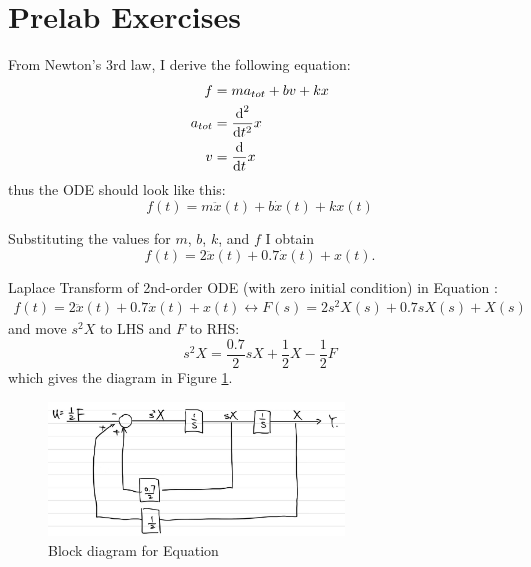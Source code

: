 

\def\LABNUMBER{1}
\def\LABTITLE{Analog Simulation}
\newcommand\K{\text{k}}



\makeMyTitle

\section{Prelab Exercises}

From Newton's 3rd law, I derive the following equation:
\begin{align*}
  f &= ma_{tot} + bv + kx \\
  a_{tot} &= \frac{\text{d}^2}{\text{d} t^2} x \\
  v &= \frac{\text{d}}{\text{d} t} x
\end{align*}
thus the ODE should look like this:
\begin{equation*}
  f(t)=m\ddot{x}(t)+b\dot{x}(t)+kx(t)
\end{equation*}

Substituting the values for $m$, $b$, $k$, and $f$ I obtain
\begin{equation}\label{eq-ode}
  f(t)=2\ddot{x}(t)+0.7\dot{x}(t)+x(t).
\end{equation}



Laplace Transform of 2nd-order ODE (with zero initial condition) in Equation
:
\begin{align*}
  f(t)=2\ddot{x}(t)+0.7\dot{x}(t)+x(t) \leftrightarrow F(s)=2 s^2 X(s)+
                                                            0.7 sX(s) + X(s)
\end{align*}
and move $s^2 X$ to LHS and $F$ to RHS:
\begin{equation} 
  s^2 X = \frac{0.7}{2}sX+\frac{1}{2}X-\frac{1}{2}F
  \label{eq-diagram}
\end{equation}
which gives the diagram in Figure \ref{pic-diagram}.
\begin{figure}[h!]
  \centering
  \includegraphics[width=0.7\textwidth]{pics/prelab-blkdgm.jpg}
  \caption{Block diagram for Equation }
  \label{pic-diagram}
\end{figure}
% 

